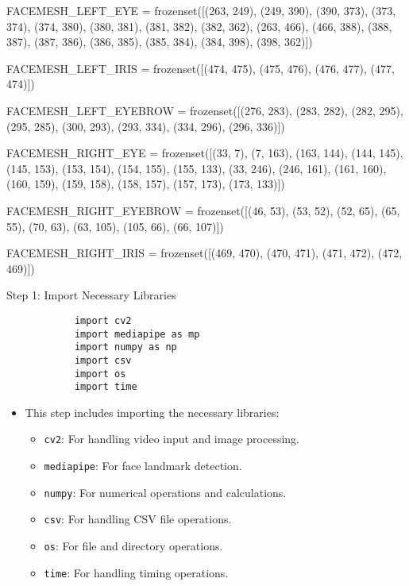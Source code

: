 \documentclass{beamer}
\begin{document}
	\begin{frame}
		FACEMESH_LEFT_EYE = frozenset([(263, 249), (249, 390), (390, 373), (373, 374),
		(374, 380), (380, 381), (381, 382), (382, 362),
		(263, 466), (466, 388), (388, 387), (387, 386),
		(386, 385), (385, 384), (384, 398), (398, 362)])
		
		FACEMESH_LEFT_IRIS = frozenset([(474, 475), (475, 476), (476, 477),
		(477, 474)])
		
		FACEMESH_LEFT_EYEBROW = frozenset([(276, 283), (283, 282), (282, 295),
		(295, 285), (300, 293), (293, 334),
		(334, 296), (296, 336)])
		
		FACEMESH_RIGHT_EYE = frozenset([(33, 7), (7, 163), (163, 144), (144, 145),
		(145, 153), (153, 154), (154, 155), (155, 133),
		(33, 246), (246, 161), (161, 160), (160, 159),
		(159, 158), (158, 157), (157, 173), (173, 133)])
		
		FACEMESH_RIGHT_EYEBROW = frozenset([(46, 53), (53, 52), (52, 65), (65, 55),
		(70, 63), (63, 105), (105, 66), (66, 107)])
		
		FACEMESH_RIGHT_IRIS = frozenset([(469, 470), (470, 471), (471, 472),
		(472, 469)])
	\end{frame}
	\begin{frame}[fragile]{Step 1: Import Necessary Libraries}
		\tiny
		\begin{verbatim}
			import cv2
			import mediapipe as mp
			import numpy as np
			import csv
			import os
			import time
		\end{verbatim}
		\begin{itemize}
			\item This step includes importing the necessary libraries:
			\begin{itemize}
				\item \texttt{cv2}: For handling video input and image processing.
				\item \texttt{mediapipe}: For face landmark detection.
				\item \texttt{numpy}: For numerical operations and calculations.
				\item \texttt{csv}: For handling CSV file operations.
				\item \texttt{os}: For file and directory operations.
				\item \texttt{time}: For handling timing operations.
			\end{itemize}
		\end{itemize}
	\end{frame}
	
\end{document}
